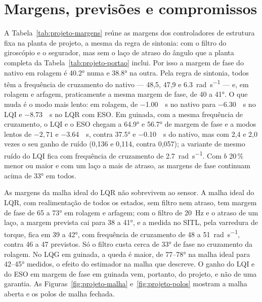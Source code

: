 \section{Margens, previsões e compromissos}
\label{sec:projeto-margens}

A Tabela~\ref{tab:projeto-margens} reúne as margens dos controladores de
estrutura fixa na planta de projeto, a mesma da regra de sintonia: com o
filtro do giroscópio e o segurador, mas sem o laço de atraso do ângulo que a
planta completa da Tabela~\ref{tab:projeto-portao} inclui. Por isso a margem
de fase do nativo em rolagem é \ang{40.2} numa e \ang{38.8} na outra. Pela
regra de sintonia, todos têm a
frequência de cruzamento do nativo --- 48,5, 47,9 e
\SI{6.3}{\radian\per\second} --- e, em rolagem e arfagem, praticamente a
mesma margem de fase, de 40 a \ang{41}. O que muda é o modo mais lento: em
rolagem, de \SI{-1.00}{\per\second} no nativo para \SI{-6.30}{\per\second}
no LQI e \SI{-8.73}{\per\second} no LQR com ESO. Em guinada, com a mesma
frequência de cruzamento, o LQI e o ESO chegam a \ang{64.9} e \ang{56.7} de
margem de fase e a modos lentos de $-2{,}71$ e
\SI{-3.64}{\per\second}, contra \ang{37.5} e \SI{-0.10}{\per\second} do
nativo, mas com 2,4 e 2,0 vezes o seu ganho de ruído (0,136 e 0,114, contra
0,057); a variante de mesmo ruído do LQI fica com frequência de cruzamento de
\SI{2.7}{\radian\per\second}. Com $b$ 20\,\% menor ou maior e com um laço a
mais de atraso, as margens de fase continuam acima de \ang{33} em todos.

\begin{table}[htbp]
\centering
\caption{Margens dos controladores de estrutura fixa na planta de projeto.}
\label{tab:projeto-margens}
\resizebox{\textwidth}{!}{}

\end{table}

As margens da malha ideal do LQR não sobrevivem ao sensor. A malha ideal do LQR,
com realimentação de todos os estados, sem filtro nem atraso, tem margem de
fase de 65 a \ang{73} em rolagem e arfagem; com o filtro de \SI{20}{\hertz}
e o atraso de um laço, a margem prevista cai para 38 a \ang{41}, e a medida
no SITL, pela varredura de torque, fica em 39 a \ang{42}, com frequência de
cruzamento de 48 a \SI{51}{\radian\per\second}, contra 46 a 47 previstos. Só
o filtro custa cerca de \ang{33} de fase no cruzamento da rolagem. No LQG em
guinada, a queda é maior, de 77--\ang{78} na malha ideal para 42--\ang{45}
medidos, o efeito do estimador na malha que  descreve.
O ganho do LQI e do ESO em margem de fase em guinada vem, portanto, do
projeto, e não de uma garantia. As Figuras~\ref{fig:projeto-malha}
e~\ref{fig:projeto-polos} mostram a malha aberta e os polos de malha fechada.

